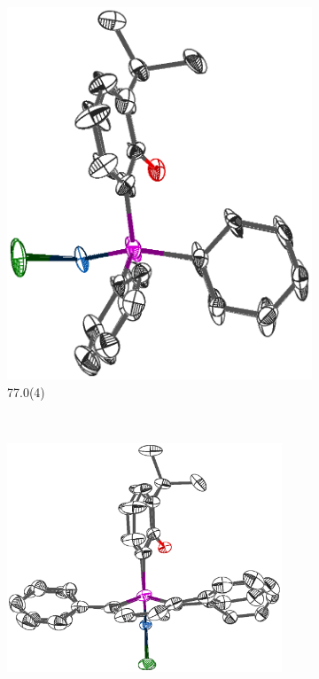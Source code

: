 \begin{figure}[htbp]
\begin{subfigure}[b]{0.3\textwidth}
                \includegraphics[width=\textwidth]{../Othercrystals/PtCl2/730506side.eps}
                \caption{77.0(4)\degrees{}\cite{Niksch2010}}
                \label{PtCl2Cyside}
        \end{subfigure}%
        \\
        \begin{subfigure}[b]{0.4\textwidth}
                \includegraphics[width=0.9\textwidth]{../Othercrystals/PtCl2/687181side.eps}

\end{subfigure}
\end{figure}
